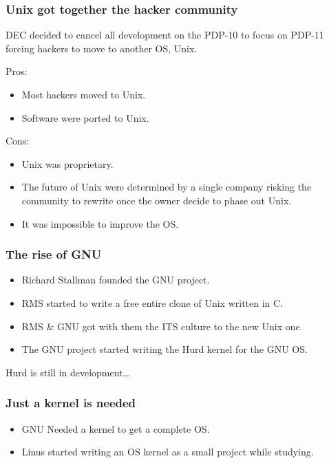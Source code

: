 \documentclass[hyperref={pdfpagelabels=false},xcolor=pst,pdf,fragile]{beamer}
\begin{document}
\begin{frame}
  \frametitle{Unix got together the hacker community}

  DEC decided to cancel all development on the PDP-10 to focus on PDP-11
  forcing hackers to move to another OS, Unix.

  Pros:
  \begin{itemize}
	  \item Most hackers moved to Unix.
	  \item Software were ported to Unix.
  \end{itemize}

  Cons:
  \begin{itemize}
	  \item Unix was proprietary.
	  \item The future of Unix were determined by a single company risking
		  the community to rewrite once the owner decide to phase out Unix.
	  \item It was impossible to improve the OS.
  \end{itemize}

\end{frame}

\begin{frame}
  \frametitle{The rise of GNU}

  \begin{itemize}
	  \item Richard Stallman founded the GNU project.
	  \item RMS started to write a \alert{free} entire clone of Unix written in C.
	  \item RMS \& GNU got with them the ITS culture to the new Unix one.
	  \item The GNU project started writing the Hurd kernel for the GNU OS.
  \end{itemize}

  \hskip-20pt
  \pause
  \begin{center}
	  Hurd is still in development\ldots
  \end{center}

\end{frame}

\begin{frame}
  \frametitle{Just a kernel is needed}

  \begin{itemize}
	  \item GNU Needed a kernel to get a complete OS.
	  \item Linus started writing an OS kernel as a small project while
		  studying.
  \end{itemize}

\end{frame}
\end{document}
